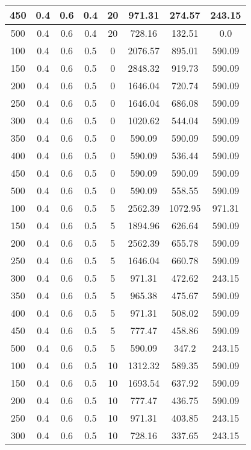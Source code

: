 \documentclass[a4paper, 12pt]{extreport}
\begin{document}
\begin{itemize}
\begin{longtable}{|c|c|c|c|c|c|c|c|}
			450 & 0.4 & 0.6 & 0.4 & 20 & 971.31 & 274.57 & 243.15 \\\hline
			500 & 0.4 & 0.6 & 0.4 & 20 & 728.16 & 132.51 & 0.0 \\\hline
			100 & 0.4 & 0.6 & 0.5 & 0 & 2076.57 & 895.01 & 590.09 \\\hline
			150 & 0.4 & 0.6 & 0.5 & 0 & 2848.32 & 919.73 & 590.09 \\\hline
			200 & 0.4 & 0.6 & 0.5 & 0 & 1646.04 & 720.74 & 590.09 \\\hline
			250 & 0.4 & 0.6 & 0.5 & 0 & 1646.04 & 686.08 & 590.09 \\\hline
			300 & 0.4 & 0.6 & 0.5 & 0 & 1020.62 & 544.04 & 590.09 \\\hline
			350 & 0.4 & 0.6 & 0.5 & 0 & 590.09 & 590.09 & 590.09 \\\hline
			400 & 0.4 & 0.6 & 0.5 & 0 & 590.09 & 536.44 & 590.09 \\\hline
			450 & 0.4 & 0.6 & 0.5 & 0 & 590.09 & 590.09 & 590.09 \\\hline
			500 & 0.4 & 0.6 & 0.5 & 0 & 590.09 & 558.55 & 590.09 \\\hline
			100 & 0.4 & 0.6 & 0.5 & 5 & 2562.39 & 1072.95 & 971.31 \\\hline
			150 & 0.4 & 0.6 & 0.5 & 5 & 1894.96 & 626.64 & 590.09 \\\hline
			200 & 0.4 & 0.6 & 0.5 & 5 & 2562.39 & 655.78 & 590.09 \\\hline
			250 & 0.4 & 0.6 & 0.5 & 5 & 1646.04 & 660.78 & 590.09 \\\hline
			300 & 0.4 & 0.6 & 0.5 & 5 & 971.31 & 472.62 & 243.15 \\\hline
			350 & 0.4 & 0.6 & 0.5 & 5 & 965.38 & 475.67 & 590.09 \\\hline
			400 & 0.4 & 0.6 & 0.5 & 5 & 971.31 & 508.02 & 590.09 \\\hline
			450 & 0.4 & 0.6 & 0.5 & 5 & 777.47 & 458.86 & 590.09 \\\hline
			500 & 0.4 & 0.6 & 0.5 & 5 & 590.09 & 347.2 & 243.15 \\\hline
			100 & 0.4 & 0.6 & 0.5 & 10 & 1312.32 & 589.35 & 590.09 \\\hline
			150 & 0.4 & 0.6 & 0.5 & 10 & 1693.54 & 637.92 & 590.09 \\\hline
			200 & 0.4 & 0.6 & 0.5 & 10 & 777.47 & 436.75 & 590.09 \\\hline
			250 & 0.4 & 0.6 & 0.5 & 10 & 971.31 & 403.85 & 243.15 \\\hline
			300 & 0.4 & 0.6 & 0.5 & 10 & 728.16 & 337.65 & 243.15 \\\hline

\end{longtable}
\end{itemize}
\end{document}
